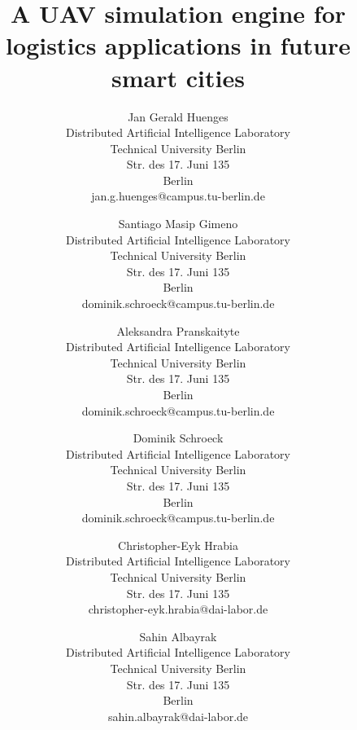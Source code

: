 \documentclass{scspaperproc}
\theoremstyle{scsthe}
\begin{document}
\title{A UAV simulation engine for logistics applications in future smart cities}

\author{Jan Gerald Huenges \\[12pt]
Distributed Artificial Intelligence Laboratory \\
Technical University Berlin \\
Str. des 17. Juni 135 \\
Berlin \\
jan.g.huenges@campus.tu-berlin.de \\
\and
Santiago Masip Gimeno \\ [12pt]
Distributed Artificial Intelligence Laboratory \\
Technical University Berlin \\
Str. des 17. Juni 135 \\
Berlin \\
dominik.schroeck@campus.tu-berlin.de \\
\and
Aleksandra Pranskaityte \\ [12pt]
Distributed Artificial Intelligence Laboratory \\
Technical University Berlin \\
Str. des 17. Juni 135 \\
Berlin \\
dominik.schroeck@campus.tu-berlin.de \\
\and
Dominik Schroeck \\ [12pt]
Distributed Artificial Intelligence Laboratory \\
Technical University Berlin \\
Str. des 17. Juni 135 \\
Berlin \\
dominik.schroeck@campus.tu-berlin.de \\
\and
Christopher-Eyk Hrabia \\ [12pt]
Distributed Artificial Intelligence Laboratory \\
Technical University Berlin \\
Str. des 17. Juni 135 \\
christopher-eyk.hrabia@dai-labor.de \\
\and
Sahin Albayrak\\[12pt]
Distributed Artificial Intelligence Laboratory \\
Technical University Berlin \\
Str. des 17. Juni 135 \\
Berlin \\
sahin.albayrak@dai-labor.de
}
\maketitle
\end{document}
